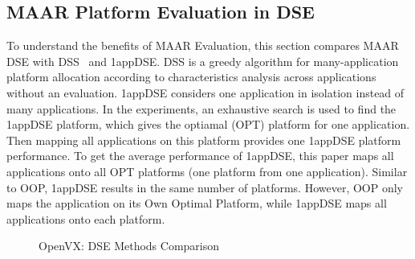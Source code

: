 \vspace{-2pt}
\subsection{MAAR Platform Evaluation in DSE}
\label{subsec:res-overall}

To understand the benefits of MAAR Evaluation, this section compares MAAR DSE with DSS~\cite{zhang2018ds} and 1appDSE. DSS is a greedy algorithm for many-application platform allocation according to characteristics analysis across applications without an evaluation. 1appDSE considers one application in isolation instead of many applications. In the experiments, an exhaustive search is used to find the 1appDSE platform, which gives the optiamal (OPT) platform for one application. Then mapping all applications on this platform provides one 1appDSE platform performance. To get the average performance of 1appDSE, this paper maps all applications onto all OPT platforms (one platform from one application). Similar to OOP, 1appDSE results in the same number of platforms. However, OOP only maps the application on its Own Optimal Platform, while 1appDSE maps all applications onto each platform.

%

\begin{figure}[h]
\vspace{-8pt}
	\centering
		\hfill
		\hfill
	\vspace{-8pt}
	\caption{OpenVX: DSE Methods Comparison }
	\label{fig:avg}
\end{figure}

